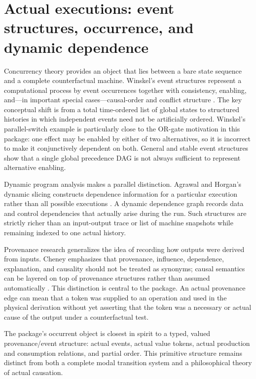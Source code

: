\documentclass[11pt,a4paper]{article}
\begin{document}
\section{Actual executions: event structures, occurrence, and dynamic dependence}

Concurrency theory provides an object that lies between a bare state sequence and a complete counterfactual machine. Winskel's event structures represent a computational process by event occurrences together with consistency, enabling, and---in important special cases---causal-order and conflict structure \cite{Winskel1987}. The key conceptual shift is from a total time-ordered list of global states to structured histories in which independent events need not be artificially ordered. Winskel's parallel-switch example is particularly close to the OR-gate motivation in this package: one effect may be enabled by either of two alternatives, so it is incorrect to make it conjunctively dependent on both. General and stable event structures show that a single global precedence DAG is not always sufficient to represent alternative enabling.

Dynamic program analysis makes a parallel distinction. Agrawal and Horgan's dynamic slicing constructs dependence information for a particular execution rather than all possible executions \cite{AgrawalHorgan1990}. A dynamic dependence graph records data and control dependencies that actually arise during the run. Such structures are strictly richer than an input-output trace or list of machine snapshots while remaining indexed to one actual history.

Provenance research generalizes the idea of recording how outputs were derived from inputs. Cheney emphasizes that provenance, influence, dependence, explanation, and causality should not be treated as synonyms; causal semantics can be layered on top of provenance structures rather than assumed automatically \cite{Cheney2010}. This distinction is central to the package. An actual provenance edge can mean that a token was supplied to an operation and used in the physical derivation without yet asserting that the token was a necessary or actual cause of the output under a counterfactual test.

\begin{takeawaybox}
The package's occurrent object is closest in spirit to a typed, valued provenance/event structure: actual events, actual value tokens, actual production and consumption relations, and partial order. This primitive structure remains distinct from both a complete modal transition system and a philosophical theory of actual causation.
\end{takeawaybox}
\end{document}
